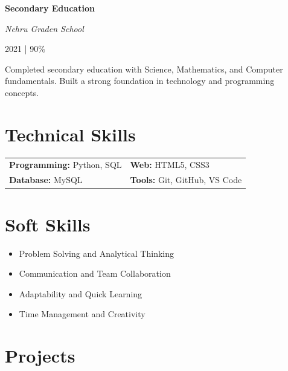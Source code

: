 \documentclass[11pt,a4paper]{article}
\begin{document}
\vspace{8pt}



\textbf{Secondary Education}

\textit{Nehru Graden School}

\hfill 2021 | 90\%


Completed secondary education with Science, Mathematics, and Computer fundamentals.
Built a strong foundation in technology and programming concepts.





\section*{Technical Skills}


\begin{tabularx}{\textwidth}{X X}


\textbf{Programming:} 
Python, SQL
&
\textbf{Web:}
HTML5, CSS3


\\[8pt]


\textbf{Database:}
MySQL
&
\textbf{Tools:}
Git, GitHub, VS Code


\end{tabularx}





\section*{Soft Skills}


\begin{itemize}[leftmargin=1.2em]

\item Problem Solving and Analytical Thinking

\item Communication and Team Collaboration

\item Adaptability and Quick Learning

\item Time Management and Creativity

\end{itemize}





\section*{Projects}
\end{document}
